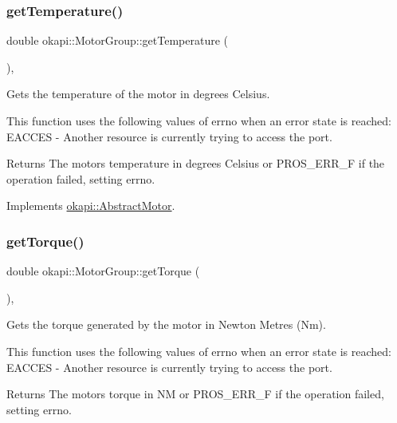 \subsubsection{\texorpdfstring{getTemperature()}{getTemperature()}}
{\footnotesize\ttfamily double okapi\+::\+Motor\+Group\+::get\+Temperature (\begin{DoxyParamCaption}{ }\end{DoxyParamCaption})\hspace{0.3cm}{\ttfamily [override]}, {\ttfamily [virtual]}}

Gets the temperature of the motor in degrees Celsius.

This function uses the following values of errno when an error state is reached\+: E\+A\+C\+C\+ES -\/ Another resource is currently trying to access the port.

\begin{DoxyReturn}{Returns}
The motor\textquotesingle{}s temperature in degrees Celsius or {\ttfamily P\+R\+O\+S\+\_\+\+E\+R\+R\+\_\+F} if the operation failed, setting errno. 
\end{DoxyReturn}


Implements \mbox{\hyperlink{classokapi_1_1AbstractMotor_a96ef2dc7eeb1ac23713e3e37af9e95f2}{okapi\+::\+Abstract\+Motor}}.

\mbox{\label{classokapi_1_1MotorGroup_a591e2ac0cc80b58f6b5b767c5d0128c5}} 
\subsubsection{\texorpdfstring{getTorque()}{getTorque()}}
{\footnotesize\ttfamily double okapi\+::\+Motor\+Group\+::get\+Torque (\begin{DoxyParamCaption}{ }\end{DoxyParamCaption})\hspace{0.3cm}{\ttfamily [override]}, {\ttfamily [virtual]}}

Gets the torque generated by the motor in Newton Metres (Nm).

This function uses the following values of errno when an error state is reached\+: E\+A\+C\+C\+ES -\/ Another resource is currently trying to access the port.

\begin{DoxyReturn}{Returns}
The motor\textquotesingle{}s torque in NM or {\ttfamily P\+R\+O\+S\+\_\+\+E\+R\+R\+\_\+F} if the operation failed, setting errno. 
\end{DoxyReturn}


